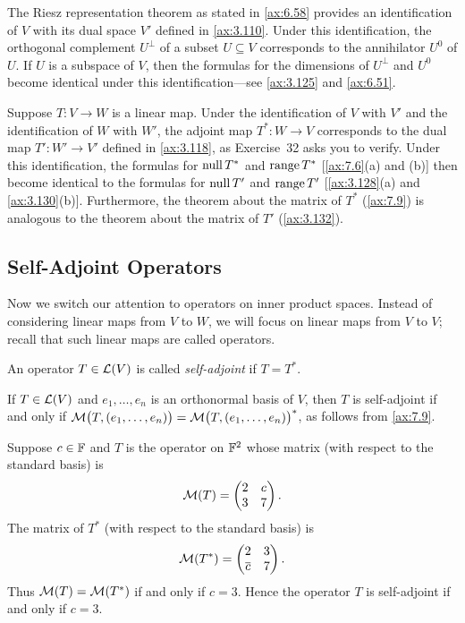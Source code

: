 The Riesz representation theorem as stated in \ref{ax:6.58} provides an
identification of $V$ with its dual space $V'$ defined in \ref{ax:3.110}. Under
this identification, the orthogonal complement $U^\perp$ of a subset
$U\subseteq V$ corresponds to the annihilator $U^0$ of $U$. If $U$ is a subspace
of $V$, then the formulas for the dimensions of $U^\perp$ and $U^0$ become
identical under this identification---see \ref{ax:3.125} and \ref{ax:6.51}.

%
Suppose $T\colon V\to W$ is a linear map. Under the identification of $V$ with
$V'$ and the identification of $W$ with $W'$, the adjoint map
$T^*\colon W\to V$ corresponds to the dual map $T'\colon W'\to V'$ defined in
\ref{ax:3.118}, as Exercise~32 asks you to verify. Under this identification,
the formulas for $\operatorname{null} T^*$ and $\operatorname{range} T^*$ [\ref{ax:7.6}(a) and (b)] then
become identical to the formulas for $\operatorname{null} T'$ and $\operatorname{range} T'$
[\ref{ax:3.128}(a) and \ref{ax:3.130}(b)]. Furthermore, the theorem about the
matrix of $T^*$ (\ref{ax:7.9}) is analogous to the theorem about the matrix of
$T'$ (\ref{ax:3.132}).

\subsection{Self-Adjoint Operators}

Now we switch our attention to operators on inner product spaces. Instead of
considering linear maps from $V$ to $W$, we will focus on linear maps from $V$
to $V$; recall that such linear maps are called operators.

\begin{definition}\label{ax:7.10}
An operator $T\in\mathcal{L}(V)$ is called \emph{self-adjoint} if $T=T^*$.
\end{definition}

If $T\in\mathcal{L}(V)$ and $e_1,\dots,e_n$ is an orthonormal basis of $V$, then $T$
is self-adjoint if and only if
$\mathcal{M}\bigl(T,(e_1,\dots,e_n)\bigr)=\mathcal{M}\bigl(T,(e_1,\dots,e_n)\bigr)^*$, as
follows from \ref{ax:7.9}.

\begin{example}%
\label{ax:7.11}
Suppose $c\in\mathbb{F}$ and $T$ is the operator on $\mathbb{F}^2$ whose matrix (with respect
to the standard basis) is
\[ \mathcal{M}(T) = \begin{pmatrix} 2 & c\\ 3 & 7 \end{pmatrix}. \]
The matrix of $T^*$ (with respect to the standard basis) is
\[ \mathcal{M}(T^*) = \begin{pmatrix} 2 & 3\\ \overline{c} & 7 \end{pmatrix}. \]
Thus $\mathcal{M}(T)=\mathcal{M}(T^*)$ if and only if $c=3$. Hence the operator $T$ is
self-adjoint if and only if $c=3$.
\end{example}


